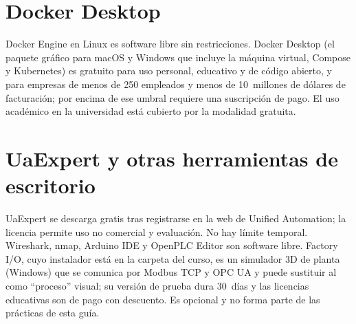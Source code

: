 \section{Docker Desktop}

Docker Engine en Linux es software libre sin restricciones. Docker Desktop (el paquete gráfico para macOS y Windows que incluye la máquina virtual, Compose y Kubernetes) es gratuito para uso personal, educativo y de código abierto, y para empresas de menos de 250 empleados y menos de 10~millones de dólares de facturación; por encima de ese umbral requiere una suscripción de pago. El uso académico en la universidad está cubierto por la modalidad gratuita.

\section{UaExpert y otras herramientas de escritorio}

UaExpert se descarga gratis tras registrarse en la web de Unified Automation; la licencia permite uso no comercial y evaluación. No hay límite temporal. Wireshark, nmap, Arduino IDE y OpenPLC Editor son software libre. Factory I/O, cuyo instalador está en la carpeta del curso, es un simulador 3D de planta (Windows) que se comunica por Modbus TCP y OPC UA y puede sustituir al  como ``proceso'' visual; su versión de prueba dura 30~días y las licencias educativas son de pago con descuento. Es opcional y no forma parte de las prácticas de esta guía.
